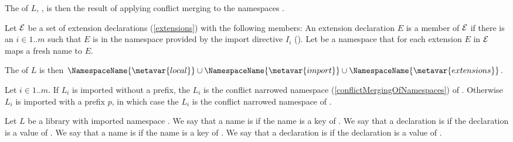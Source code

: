 \documentclass[makeidx]{article}
\begin{document}
{\LMHash{}%
The  of $L$, ,
is then the result of applying conflict merging to the namespaces
.

\LMHash{}%
Let $\cal E$ be a set of extension declarations
(\ref{extensions})
with the following members:
An extension declaration $E$ is a member of $\cal E$
if there is an $i \in 1 .. m$ such that
$E$ is in the namespace provided by the import directive $I_i$
().
Let  be a namespace that
for each extension $E$ in $\cal E$ maps a fresh name to $E$.


\LMHash{}%
The  of $L$ is then
$\NamespaceName{\metavar{local}} \cup
\NamespaceName{\metavar{import}} \cup
\NamespaceName{\metavar{extensions}}$.

\LMHash{}%
Let $i \in 1 .. m$.
If $L_i$ is imported without a prefix, the
$L_i$ is the conflict narrowed namespace
(\ref{conflictMergingOfNamespaces})
of .
%
Otherwise $L_i$ is imported with a prefix $p$,
in which case the  $L_i$
is the conflict narrowed namespace
of .


\LMHash{}%
Let $L$ be a library with imported namespace \NamespaceName.
We say that a name is
if the name is a key of \NamespaceName.
We say that a declaration is
if the declaration is a value of \NamespaceName.
We say that a name is
if the name is a key of .
We say that a declaration is
if the declaration is a value of .


}
\end{document}
